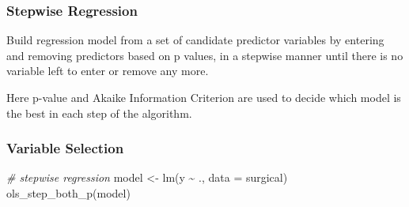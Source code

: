 \documentclass[
]{article}
\newenvironment{Shaded}{\begin{snugshade}}{\end{snugshade}}
\newcommand{\AttributeTok}[1]{\textcolor[rgb]{0.77,0.63,0.00}{#1}}
\newcommand{\CommentTok}[1]{\textcolor[rgb]{0.56,0.35,0.01}{\textit{#1}}}
\newcommand{\FunctionTok}[1]{\textcolor[rgb]{0.00,0.00,0.00}{#1}}
\newcommand{\NormalTok}[1]{#1}
\newcommand{\OtherTok}[1]{\textcolor[rgb]{0.56,0.35,0.01}{#1}}
\newcommand{\SpecialCharTok}[1]{\textcolor[rgb]{0.00,0.00,0.00}{#1}}
\begin{document}
\hypertarget{stepwise-regression}{%
\subsubsection{Stepwise Regression}\label{stepwise-regression}}

Build regression model from a set of candidate predictor variables by
entering and removing predictors based on p values, in a stepwise manner
until there is no variable left to enter or remove any more.

Here p-value and Akaike Information Criterion are used to decide which
model is the best in each step of the algorithm.

\hypertarget{variable-selection}{%
\subsubsection{Variable Selection}\label{variable-selection}}

\begin{Shaded}
\begin{Highlighting}[]
\CommentTok{\# stepwise regression}
\NormalTok{model }\OtherTok{\textless{}{-}} \FunctionTok{lm}\NormalTok{(y }\SpecialCharTok{\textasciitilde{}}\NormalTok{ ., }\AttributeTok{data =}\NormalTok{ surgical)}
\FunctionTok{ols\_step\_both\_p}\NormalTok{(model)}
\end{Highlighting}
\end{Shaded}
\end{document}
